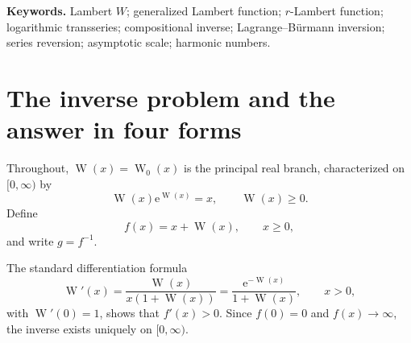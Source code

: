 \documentclass[11pt,oneside]{article}
\theoremstyle{plain}
\theoremstyle{definition}
\theoremstyle{remark}
\newcommand{\W}{\operatorname{W}}
\newcommand{\e}{\mathrm{e}}
\begin{document}
\noindent\textbf{Keywords.}
Lambert \(W\); generalized Lambert function; \(r\)-Lambert function;
logarithmic transseries; compositional inverse; Lagrange--B\"urmann inversion;
series reversion; asymptotic scale; harmonic numbers.

{\small\tableofcontents}
\clearpage

\section{The inverse problem and the answer in four forms}
\label{sec:intro}

Throughout, \(\W(x)=\W_0(x)\) is the principal real branch, characterized on
\([0,\infty)\) by
\begin{equation}
 \W(x)\e^{\W(x)}=x,\qquad \W(x)\ge0.
 \label{eq:Wdef}
\end{equation}
Define
\begin{equation}
 f(x)=x+\W(x),\qquad x\ge0,
 \label{eq:fdef}
\end{equation}
and write \(g=f^{-1}\).

The standard differentiation formula
\begin{equation}
 \W'(x)=\frac{\W(x)}{x(1+\W(x))}
       =\frac{\e^{-\W(x)}}{1+\W(x)},
 \qquad x>0,
 \label{eq:Wprime}
\end{equation}
with \(\W'(0)=1\), shows that \(f'(x)>0\).  Since \(f(0)=0\) and
\(f(x)\to\infty\), the inverse exists uniquely on \([0,\infty)\).
\end{document}
